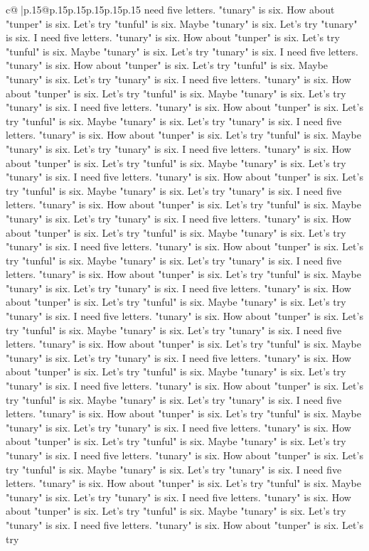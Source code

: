 \documentclass{article}
\begin{document}
{\begin{supertabular}{c@{$\;$}|p{.15\linewidth}@{}p{.15\linewidth}p{.15\linewidth}p{.15\linewidth}p{.15\linewidth}p{.15\linewidth}}
{{{need five letters. "tunary" is six. How about "tunper" is six. Let's try "tunful" is six. Maybe "tunary" is six. Let's try "tunary" is six. I need five letters. "tunary" is six. How about "tunper" is six. Let's try "tunful" is six. Maybe "tunary" is six. Let's try "tunary" is six. I need five letters. "tunary" is six. How about "tunper" is six. Let's try "tunful" is six. Maybe "tunary" is six. Let's try "tunary" is six. I need five letters. "tunary" is six. How about "tunper" is six. Let's try "tunful" is six. Maybe "tunary" is six. Let's try "tunary" is six. I need five letters. "tunary" is six. How about "tunper" is six. Let's try "tunful" is six. Maybe "tunary" is six. Let's try "tunary" is six. I need five letters. "tunary" is six. How about "tunper" is six. Let's try "tunful" is six. Maybe "tunary" is six. Let's try "tunary" is six. I need five letters. "tunary" is six. How about "tunper" is six. Let's try "tunful" is six. Maybe "tunary" is six. Let's try "tunary" is six. I need five letters. "tunary" is six. How about "tunper" is six. Let's try "tunful" is six. Maybe "tunary" is six. Let's try "tunary" is six. I need five letters. "tunary" is six. How about "tunper" is six. Let's try "tunful" is six. Maybe "tunary" is six. Let's try "tunary" is six. I need five letters. "tunary" is six. How about "tunper" is six. Let's try "tunful" is six. Maybe "tunary" is six. Let's try "tunary" is six. I need five letters. "tunary" is six. How about "tunper" is six. Let's try "tunful" is six. Maybe "tunary" is six. Let's try "tunary" is six. I need five letters. "tunary" is six. How about "tunper" is six. Let's try "tunful" is six. Maybe "tunary" is six. Let's try "tunary" is six. I need five letters. "tunary" is six. How about "tunper" is six. Let's try "tunful" is six. Maybe "tunary" is six. Let's try "tunary" is six. I need five letters. "tunary" is six. How about "tunper" is six. Let's try "tunful" is six. Maybe "tunary" is six. Let's try "tunary" is six. I need five letters. "tunary" is six. How about "tunper" is six. Let's try "tunful" is six. Maybe "tunary" is six. Let's try "tunary" is six. I need five letters. "tunary" is six. How about "tunper" is six. Let's try "tunful" is six. Maybe "tunary" is six. Let's try "tunary" is six. I need five letters. "tunary" is six. How about "tunper" is six. Let's try "tunful" is six. Maybe "tunary" is six. Let's try "tunary" is six. I need five letters. "tunary" is six. How about "tunper" is six. Let's try "tunful" is six. Maybe "tunary" is six. Let's try "tunary" is six. I need five letters. "tunary" is six. How about "tunper" is six. Let's try "tunful" is six. Maybe "tunary" is six. Let's try "tunary" is six. I need five letters. "tunary" is six. How about "tunper" is six. Let's try "tunful" is six. Maybe "tunary" is six. Let's try "tunary" is six. I need five letters. "tunary" is six. How about "tunper" is six. Let's try "tunful" is six. Maybe "tunary" is six. Let's try "tunary" is six. I need five letters. "tunary" is six. How about "tunper" is six. Let's try "tunful" is six. Maybe "tunary" is six. Let's try "tunary" is six. I need five letters. "tunary" is six. How about "tunper" is six. Let's try }}}
\end{supertabular}}
\end{document}

